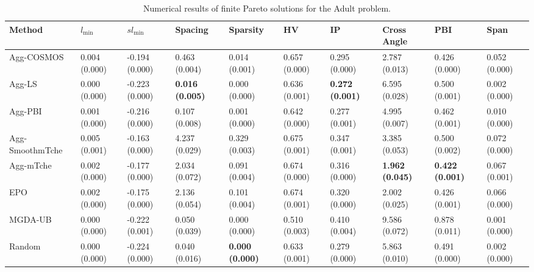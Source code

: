 \begin{table}[]
\centering
\setlength\tabcolsep{2.0 pt}
\begin{threeparttable}
\caption{Numerical results of finite Pareto solutions for the Adult problem.}
\label{tab:finite_mtl}
\centering
\tiny
\begin{tabular}{l|l|l|l|l|l|l|l|l|l}
\toprule
Method                         & $l_\mathrm{min}$ & $sl_\mathrm{min}$          & Spacing           & Sparsity          & HV                & IP                & Cross Angle       & PBI               & Span              \\ 
\midrule
Agg-COSMOS                    & 0.004 (0.000)     & -0.194 (0.000)     & 0.463 (0.004)     & 0.014 (0.001)     & 0.657 (0.000)     & 0.295 (0.000)     & 2.787 (0.013)     & 0.426 (0.000)     & 0.052 (0.000)     \\ 
Agg-LS                        & 0.000 (0.000)     & -0.223 (0.000)     & \textbf{0.016 (0.005)} & 0.000 (0.000)     & 0.636 (0.001)     & \textbf{0.272 (0.001)} & 6.595 (0.028)     & 0.500 (0.001)     & 0.002 (0.000)     \\ 
Agg-PBI                       & 0.001 (0.000)     & -0.216 (0.000)     & 0.107 (0.008)     & 0.001 (0.000)     & 0.642 (0.000)     & 0.277 (0.001)     & 4.995 (0.007)     & 0.462 (0.001)     & 0.010 (0.000)     \\ 
Agg-SmoothmTche                 & 0.005 (0.001)     & -0.163 (0.000)     & 4.237 (0.029)     & 0.329 (0.003)     & 0.675 (0.001)     & 0.347 (0.001)     & 3.385 (0.053)     & 0.500 (0.002)     & 0.072 (0.000)     \\ 
Agg-mTche                     & 0.002 (0.000)     & -0.177 (0.000)     & 2.034 (0.072)     & 0.091 (0.004)     & 0.674 (0.000)     & 0.316 (0.000)     & \textbf{1.962 (0.045)} & \textbf{0.422 (0.001)} & 0.067 (0.001)     \\ 
EPO                          & 0.002 (0.000)     & -0.175 (0.000)     & 2.136 (0.054)     & 0.101 (0.004)     & 0.674 (0.001)     & 0.320 (0.000)     & 2.002 (0.025)     & 0.426 (0.001)     & 0.066 (0.000)     \\ 
MGDA-UB                      & 0.000 (0.000)     & -0.222 (0.001)     & 0.050 (0.039)     & 0.000 (0.000)     & 0.510 (0.003)     & 0.410 (0.004)     & 9.586 (0.072)     & 0.878 (0.011)     & 0.001 (0.000)     \\ 
Random                       & 0.000 (0.000)     & -0.224 (0.000)     & 0.040 (0.016)     & \textbf{0.000 (0.000)} & 0.633 (0.001)     & 0.279 (0.000)     & 5.863 (0.010)     & 0.491 (0.000)     & 0.002 (0.000)     \\ 

\end{tabular}
\end{threeparttable}
\end{table}
